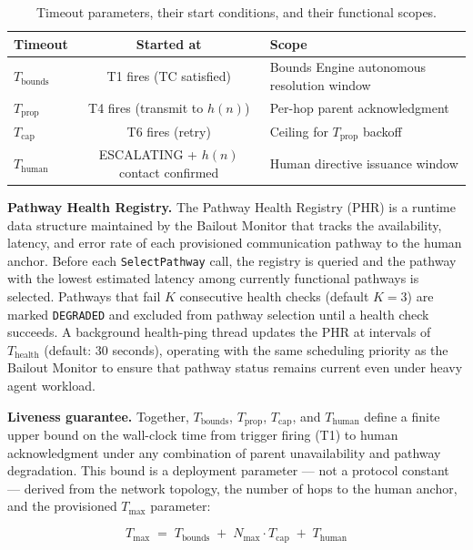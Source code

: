 \begin{table}[htbp]
\caption{Timeout parameters, their start conditions, and their functional scopes.}
\label{tab:bailout-timeouts}
\begin{tabular}{@{}lcl@{}}
\toprule
\textbf{Timeout} & \textbf{Started at} & \textbf{Scope} \\
\midrule
$T_{\text{bounds}}$ & T1 fires (TC satisfied) & Bounds Engine autonomous resolution window \\
$T_{\text{prop}}$ & T4 fires (transmit to $h(n)$) & Per-hop parent acknowledgment \\
$T_{\text{cap}}$ & T6 fires (retry) & Ceiling for $T_{\text{prop}}$ backoff \\
$T_{\text{human}}$ & ESCALATING + $h(n)$ contact confirmed & Human directive issuance window \\
\bottomrule
\end{tabular}
\end{table}

\bigskip
\noindent\textbf{Pathway Health Registry.} The Pathway Health Registry (PHR) is a runtime data structure maintained by the Bailout Monitor that tracks the availability, latency, and error rate of each provisioned communication pathway to the human anchor. Before each \texttt{SelectPathway} call, the registry is queried and the pathway with the lowest estimated latency among currently functional pathways is selected. Pathways that fail $K$ consecutive health checks (default $K = 3$) are marked \texttt{DEGRADED} and excluded from pathway selection until a health check succeeds. A background health-ping thread updates the PHR at intervals of $T_{\text{health}}$ (default: 30 seconds), operating with the same scheduling priority as the Bailout Monitor to ensure that pathway status remains current even under heavy agent workload.

\bigskip
\noindent\textbf{Liveness guarantee.} Together, $T_{\text{bounds}}$, $T_{\text{prop}}$, $T_{\text{cap}}$, and $T_{\text{human}}$ define a finite upper bound on the wall-clock time from trigger firing (T1) to human acknowledgment under any combination of parent unavailability and pathway degradation. This bound is a deployment parameter --- not a protocol constant --- derived from the network topology, the number of hops to the human anchor, and the provisioned $T_{\max}$ parameter:

\begin{equation}
T_{\max} \;=\; T_{\text{bounds}} \;+\; N_{\max} \cdot T_{\text{cap}} \;+\; T_{\text{human}} \tag{T-max}
\end{equation}

